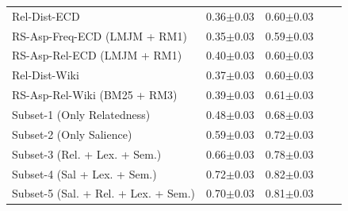\begin{table}[t]
{\begin{tabular}{@{}lllll@{}}
      
      Rel-Dist-ECD  &    
      0.36$\pm$0.03 &
      0.60$\pm$0.03
      \\
      
     
      RS-Asp-Freq-ECD (LMJM + RM1)  &     
      0.35$\pm$0.03 &
      0.59$\pm$0.03
      \\
      
       
      RS-Asp-Rel-ECD (LMJM + RM1) &     
      0.40$\pm$0.03 &
      0.60$\pm$0.03
      \\
       \midrule
      
      
      Rel-Dist-Wiki  &    
      0.37$\pm$0.03 &
      0.60$\pm$0.03
      \\
      
      
       
      RS-Asp-Rel-Wiki (BM25 + RM3)  &     
      0.39$\pm$0.03 &
      0.61$\pm$0.03
      \\
      \midrule
      
       Subset-1 (Only Relatedness) &
      0.48$\pm$0.03 &
      0.68$\pm$0.03
      \\
      
      
      Subset-2 (Only Salience) &
      0.59$\pm$0.03 &
      0.72$\pm$0.03
      \\
      
       Subset-3 (Rel. + Lex. + Sem.) &
      0.66$\pm$0.03 &
      0.78$\pm$0.03
      \\
      
       Subset-4 (Sal + Lex. + Sem.) &
      
      0.72$\pm$0.03 &
      0.82$\pm$0.03
      \\
      
      
      Subset-5 (Sal. + Rel. + Lex. + Sem.) &
      0.70$\pm$0.03 &
      0.81$\pm$0.03
      \\
     
      
      

     
      
       \bottomrule
    \end{tabular}
    }
\end{table}



